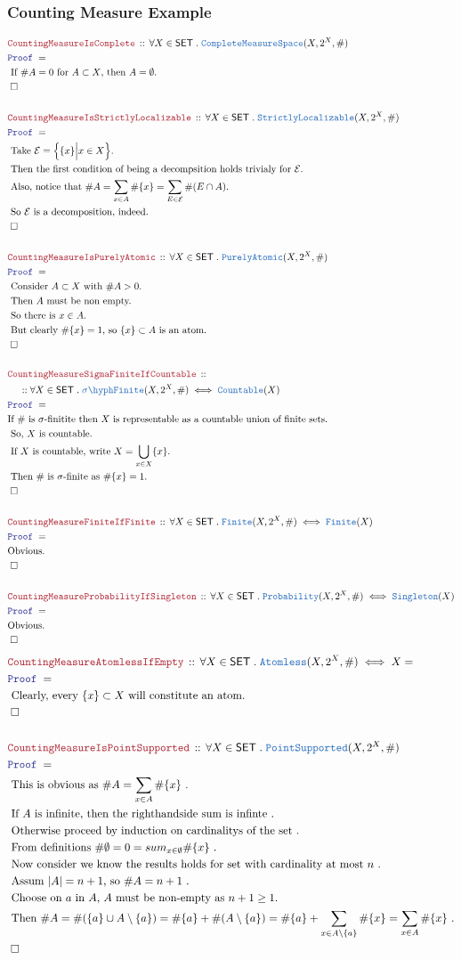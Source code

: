 \documentclass[12pt]{scrartcl}
\newcommand{\TYPE}[1]{\textcolor{NavyBlue}{\mathtt{#1}}}
\newcommand{\LOGIC}[1]{\textcolor{Blue}{\mathtt{#1}}}
\newcommand{\THM}[1]{\textcolor{Maroon}{\mathtt{#1}}}
\renewcommand{\.}{\; . \;}
\newcommand{\Theorem}[2]{& \THM{#1} \, :: \, #2 \\ & \Proof = \\ }
\newcommand{\NewLine}{\\ & \kern 1pc}
\newcommand{\Page}[1]{ \begin{align*} #1 \end{align*}   }
\newcommand{\QED}{\; \square}
\newcommand{\EndProof}{& \QED \\}
\newcommand{\Proof}{\LOGIC{Proof} \; }
\newcommand{\Explain}[1]{& \text{#1.} \\}
\newcommand{\Finite}{\TYPE{Finite}}
\newcommand{\Countable}{\TYPE{Countable}}
\newcommand{\SET}{\mathsf{SET}}
\newcommand{\Aless}{\TYPE{Atomless}}
\newcommand{\PA}{\TYPE{PurelyAtomic}}
\newcommand{\CMS}{\TYPE{CompleteMeasureSpace}}
\newcommand{\Probability}{\TYPE{Probability}}
\newcommand{\sFinite}{\TYPE{\sigma \hyph  Finite}}
\newcommand{\SLoc}{\TYPE{StrictlyLocalizable}}
\newcommand{\PtSupp}{\TYPE{PointSupported}}
\newcommand{\E}{\mathcal{E}}
\begin{document}
\subsubsection{Counting Measure Example}
\Page{
	\Theorem{CountingMeasureIsComplete}
	{
		\forall X \in \SET \.
		\CMS(X,2^X,\#)
	}
	\Explain{ 
		If $\#A=0$ for $A \subset X$, then $A = \emptyset$}
	\EndProof
	\\
	\Theorem{CountingMeasureIsStrictlyLocalizable}
	{
		\forall X \in \SET \.
		\SLoc(X,2^X,\#)
	}
	\Explain{ 
		Take $\E = \Big\{\{x\} \Big| x \in X\Big\}$}
	\Explain{
		Then the first condition of being a decompsition holds trivialy for $\E$}
	\Explain{
		Also, notice that
		$\# A = 
		\sum_{x \in A} \#\{x\}=
		\sum_{E \in \E} \#(E \cap A)
		$}
	\Explain{
		So $\E$ is a decomposition, indeed}
	\EndProof
	\\
	\Theorem{CountingMeasureIsPurelyAtomic}
	{
		\forall X \in \SET \.
		\PA(X,2^X,\#)
	}
	\Explain{
		Consider $A \subset X$ with $\#A > 0$}
	\Explain{ 
		Then $A$ must be non empty}
	\Explain{
		So there is $x \in A$}
	\Explain{
		But clearly $\#\{ x \} = 1$, so $\{x\} \subset A$ is an atom}
	\EndProof
	\\
	\Theorem{CountingMeasureSigmaFiniteIfCountable}
	{
		\NewLine ::
		\forall X \in \SET \.
		\sFinite(X,2^X,\#)
		\iff
		\Countable(X)
	}
	\Explain{If $\#$ is $\sigma$-finitite then $X$ is representable as a countable union of finite sets}
	\Explain{ So, $X$ is countable}
	\Explain{ If $X$ is countable, write $X = \bigcup_{x \in X} \{x\}$}
	\Explain{ Then $\#$ is $\sigma$-finite as $\#\{x\} = 1$}
	\EndProof
	\\
	\Theorem{CountingMeasureFiniteIfFinite}
	{
		\forall X \in \SET \.
		\Finite(X,2^X,\#)
		\iff
		\Finite(X)
	}
	\Explain{Obvious}
	\EndProof
	\\
	\Theorem{CountingMeasureProbabilityIfSingleton}
	{
		\forall X \in \SET \.
		\Probability(X,2^X,\#)
		\iff
		\TYPE{Singleton}(X)
	}
	\Explain{Obvious}
	\EndProof
}
\Page{
	\Theorem{CountingMeasureAtomlessIfEmpty}
	{
		\forall X \in \SET \.
		\Aless(X,2^X,\#)
		\iff
		X = \empty
	}
	\Explain{
		Clearly, every $\{x\} \subset X$ will constitute an atom}
	\EndProof
	\\
	\Theorem{CountingMeasureIsPointSupported}
	{
		\forall X \in \SET \.
		\PtSupp(X,2^X,\#)
	}
	\Explain{
		This is obvious as $\# A = 
		\sum_{x \in A} \#\{x\}$
	}
	\Explain{
		If $A$ is infinite, then the righthandside sum is infinte
	}
	\Explain{
		Otherwise proceed by induction on cardinalitys of the set
	}
	\Explain{
		From definitions $\# \emptyset = 0 = sum_{x \in \emptyset} \#\{x\}$
	}
	\Explain{
		Now consider we know the results holds for set with cardinality at most $n$
	}
	\Explain{
		Assum $|A| = n+1$, so $\# A = n + 1$
	}
	\Explain{ Choose on $a$ in $A$, $A$ must be non-empty as $n+1 \ge 1$}
	\Explain{
		Then $\# A = 
			\#(\{a\} \cup A \setminus \{a\}) =
			\#\{a\} + \#(A \setminus \{a\}) = 
			\#\{a\} + \sum_{x \in A \setminus \{a\}} \#\{x\} =
			\sum_{x \in A} \#\{x\}		
		$
	}
	\EndProof
}
\newpage
\end{document}
